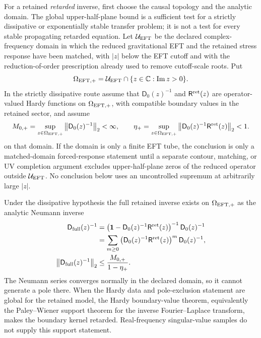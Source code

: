 \begin{controlledapproximation}
For a retained \emph{retarded} inverse, first choose the causal topology and
the analytic domain.  The global upper-half-plane bound is a sufficient test
for a strictly dissipative or exponentially stable transfer problem; it is not
a test for every stable propagating retarded equation.  Let
\(\mathcal U_{\rm EFT}\) be the declared complex-frequency domain in which the
reduced gravitational EFT and the retained stress response have been matched,
with \(|z|\) below the EFT cutoff and with the reduction-of-order prescription
already used to remove cutoff-scale roots.  Put
\[
  \Omega_{\rm EFT,+}
  =
  \mathcal U_{\rm EFT}\cap\{z\in\mathbb C:\operatorname{Im}z>0\}.
\]
In the strictly dissipative route assume that \(\mathsf D_0(z)^{-1}\) and
\(\mathsf R^{\rm ret}(z)\) are operator-valued Hardy functions on
\(\Omega_{\rm EFT,+}\), with compatible boundary values in the retained sector,
and assume
\begin{equation}
  M_{0,+}
  =
  \sup_{z\in\Omega_{\rm EFT,+}}
  \left\lVert
    \mathsf D_0(z)^{-1}
  \right\rVert_2
  <\infty,
  \qquad
  \eta_+
  =
  \sup_{z\in\Omega_{\rm EFT,+}}
  \left\lVert
    \mathsf D_0(z)^{-1}
    \mathsf R^{\rm ret}(z)
  \right\rVert_2
  <1 .
  \label{eq:semiclassical-small-gain-hypothesis}
\end{equation}
on that domain.  If the domain is only a finite EFT tube, the conclusion is
only a matched-domain forced-response statement until a separate contour,
matching, or UV completion argument excludes upper-half-plane zeros of the
reduced operator outside \(\mathcal U_{\rm EFT}\).  No conclusion below uses an
uncontrolled supremum at arbitrarily large \(|z|\).

Under the dissipative hypothesis the full retained inverse exists on
\(\Omega_{\rm EFT,+}\) as the analytic Neumann inverse
\begin{equation}
\begin{aligned}
  \mathsf D_{\rm full}(z)^{-1}
  &=
  \left(
    \mathbf 1-\mathsf D_0(z)^{-1}\mathsf R^{\rm ret}(z)
  \right)^{-1}
  \mathsf D_0(z)^{-1}
  \\
  &=
  \sum_{m\ge0}
  \left(\mathsf D_0(z)^{-1}\mathsf R^{\rm ret}(z)\right)^m
  \mathsf D_0(z)^{-1},
  \\
  \left\lVert\mathsf D_{\rm full}(z)^{-1}\right\rVert_2
  &\le
  \frac{M_{0,+}}{1-\eta_+}.
\end{aligned}
  \label{eq:semiclassical-small-gain-inverse}
\end{equation}
The Neumann series converges normally in the declared domain, so it cannot
generate a pole there.  When the Hardy data and pole-exclusion statement are
global for the retained model, the Hardy boundary-value theorem, equivalently
the Paley--Wiener support theorem for the inverse Fourier--Laplace transform,
makes the boundary kernel retarded.  Real-frequency singular-value samples do
not supply this support statement.


\end{controlledapproximation}
